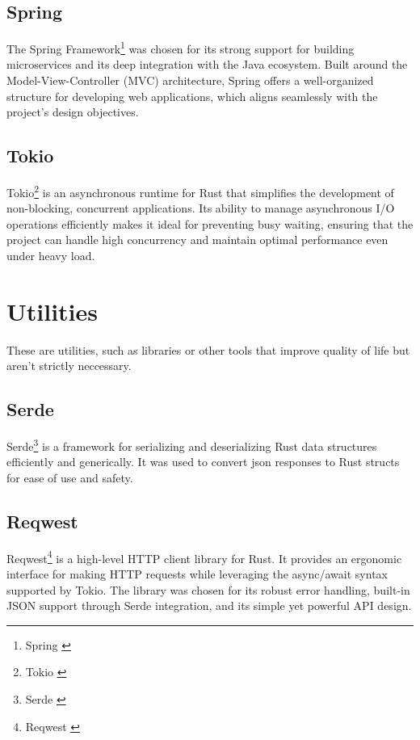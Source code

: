 \subsection{Spring}
The Spring Framework\footnote{Spring \cite{spring}} was chosen for its
strong support for building microservices
and its deep integration with the Java ecosystem.
Built around the Model-View-Controller (MVC) architecture,
Spring offers a well-organized structure
for developing web applications, which aligns seamlessly with
the project’s design objectives.

\subsection{Tokio}
Tokio\footnote{Tokio \cite{tokio}} is an asynchronous runtime for Rust
that simplifies the development of non-blocking, concurrent applications.
Its ability to manage asynchronous I/O operations efficiently makes it
ideal for preventing busy waiting,
ensuring that the project can handle high concurrency and maintain
optimal performance even under heavy load.

\section{Utilities}
These are utilities, such as libraries or other tools that improve quality of life but aren't strictly neccessary.

\subsection{Serde}
Serde\footnote{Serde \cite{serde}} is a framework for serializing and deserializing Rust data structures efficiently and generically.
It was used to convert json responses to Rust structs for ease of use and safety.

\subsection{Reqwest}
Reqwest\footnote{Reqwest \cite{reqwest}} is a high-level HTTP client library for Rust.
It provides an ergonomic interface for making HTTP requests while leveraging the async/await syntax supported by Tokio.
The library was chosen for its robust error handling, built-in JSON support through Serde integration, and its simple yet powerful API design.
